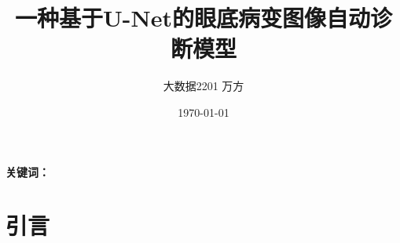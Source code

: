\documentclass[UTF8]{ctexart}
\title{一种基于U-Net的眼底病变图像自动诊断模型}
\author{大数据2201 万方}
\date{\today}
\providecommand{\keywords}[1]{
  \small
  \textbf{关键词：} #1
}
\begin{document}
\maketitle

\begin{abstract}

\end{abstract}


\keywords{}


\section{引言}


\section{}

\section{}

\section{}

\section{}





\end{document}
